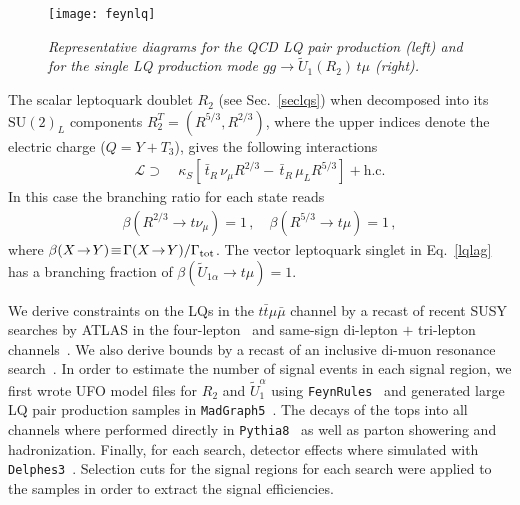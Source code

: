 \documentclass[aps,twocolumn,showpacs,preprintnumbers,amsmath,amssymb,floatfix,nofootinbib]{revtex4-1}
\begin{document}
\begin{figure}[h]
\begin{center}{
\texttt{[image: feynlq]}
\caption{\textit{Representative diagrams for the QCD LQ pair production (left) and for the single LQ production mode $gg\to \widetilde{U}_1(R_2)\,t\mu$ (right). }\label{feynlq}} }
\end{center}
\end{figure}
%

The scalar leptoquark doublet $R_2$ (see Sec.~\ref{seclqs}) when decomposed into its $\mathrm{SU(2)}_L$ components $R_2^T = (R^{5/3},R^{2/3})$, where the upper indices denote the electric charge ($Q = Y + T_3$), gives the following interactions
\begin{align} \label{myEq}
\mathcal{L} \supset&\             \kappa_S \left[  \,  \bar t_{R}  \,  \nu_{\mu}     R^{2/3}    -    \,  \bar t_{R}  \,    \mu_{L} R^{5/3}   \right]  +\text{h.c.} 
\end{align}  
%
In this case the branching ratio for each state reads
%
\begin{align}
\beta(R^{2/3} \to t \nu_{\mu}) = 1 \,, \quad   \beta(R^{5/3} \to t \mu  ) = 1  \,,
\end{align}
%
where $\beta(X\!\to\! Y)\! \equiv\! \Gamma(X\! \to\! Y)/\Gamma_{\rm{tot}}$. The vector leptoquark singlet in Eq.~\eqref{lqlag} has a branching fraction of $\beta(\widetilde U_{1 \alpha}  \to t \mu) = 1$. 

We derive constraints on the LQs in the $t\bar t \mu\bar\mu$ channel by a recast of recent SUSY searches by ATLAS in the four-lepton~\cite{Aaboud:2018zeb} and same-sign di-lepton $+$ tri-lepton channels~\cite{Aaboud:2017dmy}. We also derive bounds by a recast of an inclusive di-muon resonance search~\cite{Aaboud:2017buh}. In order to estimate the number of signal events in each signal region, we first wrote UFO model files for $R_2$ and $\widetilde{U}^\alpha_1$ using {\tt FeynRules}~\cite{Alloul:2013bka} and generated large LQ pair production samples in {\tt MadGraph5}~\cite{Alwall:2014hca}. The decays of the tops into all channels where performed directly in {\tt Pythia8}~\cite{Sjostrand:2014zea} as well as parton showering and hadronization. Finally, for each search, detector effects where simulated with {\tt Delphes3}~\cite{deFavereau:2013fsa}. Selection cuts for the signal regions for each search were applied to the samples in order to extract the signal efficiencies. 
\end{document}
